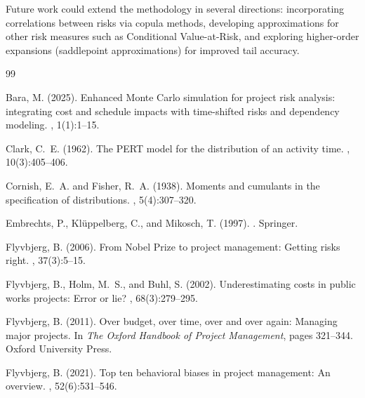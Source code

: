 \documentclass[12pt,a4paper]{article}
\theoremstyle{definition}
\theoremstyle{remark}
\begin{document}
Future work could extend the methodology in several directions: incorporating correlations between risks via copula methods, developing approximations for other risk measures such as Conditional Value-at-Risk, and exploring higher-order expansions (saddlepoint approximations) for improved tail accuracy.




\begin{thebibliography}{99}

Bara, M. (2025).
\newblock Enhanced {Monte Carlo} simulation for project risk analysis: integrating cost and schedule impacts with time-shifted risks and dependency modeling.
, 1(1):1--15.

Clark, C.~E. (1962).
\newblock The {PERT} model for the distribution of an activity time.
, 10(3):405--406.

Cornish, E.~A. and Fisher, R.~A. (1938).
\newblock Moments and cumulants in the specification of distributions.
, 5(4):307--320.

Embrechts, P., Kl{\"u}ppelberg, C., and Mikosch, T. (1997).
.
\newblock Springer.

Flyvbjerg, B. (2006).
\newblock From {Nobel Prize} to project management: Getting risks right.
, 37(3):5--15.

Flyvbjerg, B., Holm, M.~S., and Buhl, S. (2002).
\newblock Underestimating costs in public works projects: Error or lie?
, 68(3):279--295.

Flyvbjerg, B. (2011).
\newblock Over budget, over time, over and over again: Managing major projects.
\newblock In {\em The Oxford Handbook of Project Management}, pages 321--344. Oxford University Press.

Flyvbjerg, B. (2021).
\newblock Top ten behavioral biases in project management: An overview.
, 52(6):531--546.


\end{thebibliography}
\end{document}
